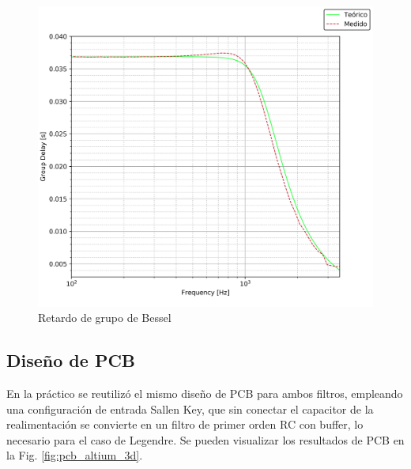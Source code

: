 \begin{figure}[H]
    \centering
    \includegraphics[scale=0.7]{../EJ1/Recursos/bessel_group_delay.png}
    \caption{Retardo de grupo de Bessel}
    \label{fig:bessel_group_delay}
\end{figure}

\subsection{Dise\~no de PCB}
En la pr\'actico se reutiliz\'o el mismo dise\~no de PCB para ambos filtros, empleando una configuraci\'on de entrada Sallen Key,
que sin conectar el capacitor de la realimentaci\'on se convierte en un filtro de primer orden RC con buffer, lo necesario para el caso
de Legendre. Se pueden visualizar los resultados de PCB en la Fig. \ref{fig:pcb_altium_3d}.


